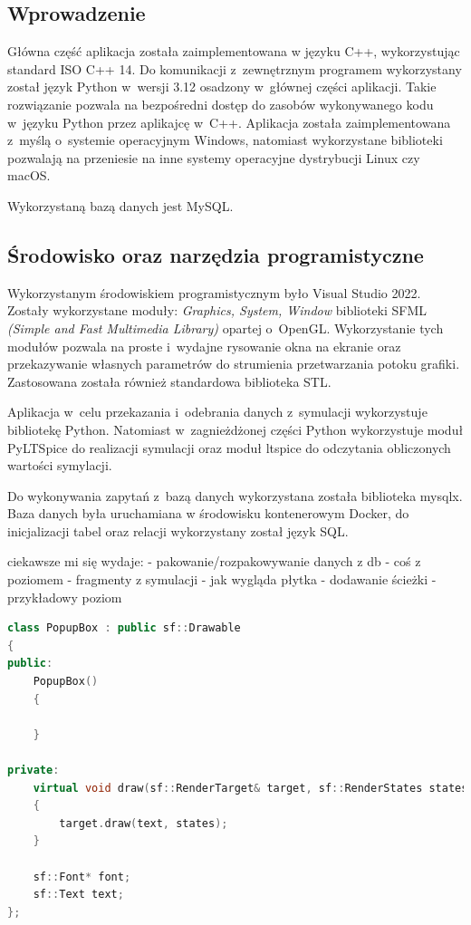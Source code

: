 \documentclass[12pt,a4paper]{article} %
\begin{document}
\subsection{Wprowadzenie} %
\aka Główna część aplikacja została zaimplementowana w języku C++, wykorzystując standard ISO C++ 14. 
Do komunikacji z~zewnętrznym programem wykorzystany został język Python w~wersji 3.12 osadzony w~głównej części aplikacji. Takie rozwiązanie pozwala na bezpośredni dostęp do zasobów wykonywanego kodu w~języku Python przez aplikajcę w~C++. 
Aplikacja została zaimplementowana z~myślą o~systemie operacyjnym Windows, natomiast wykorzystane biblioteki pozwalają na przeniesie na inne systemy operacyjne dystrybucji Linux czy macOS. %

Wykorzystaną bazą danych jest MySQL.


\subsection{Środowisko oraz narzędzia programistyczne}
\aka Wykorzystanym środowiskiem programistycznym było Visual Studio 2022. Zostały wykorzystane moduły: \textit{Graphics, System, Window} biblioteki SFML \textit{(Simple and Fast Multimedia Library)} opartej o~OpenGL. Wykorzystanie tych modułów pozwala na proste i~wydajne rysowanie okna na ekranie oraz przekazywanie własnych parametrów do strumienia przetwarzania potoku grafiki. Zastosowana została również standardowa biblioteka STL. 

\aka Aplikacja w~celu przekazania i~odebrania danych z~symulacji wykorzystuje bibliotekę Python. Natomiast w~zagnieżdżonej części Python wykorzystuje moduł PyLTSpice do realizacji symulacji oraz moduł ltspice do odczytania obliczonych wartości symylacji.

\aka Do wykonywania zapytań z~bazą danych wykorzystana została biblioteka mysqlx. Baza danych była uruchamiana w środowisku kontenerowym Docker, do inicjalizacji tabel oraz relacji wykorzystany został język SQL. 

ciekawsze mi się wydaje:
- pakowanie/rozpakowywanie danych z db
- coś z poziomem
- fragmenty z symulacji
- jak wygląda płytka
- dodawanie ścieżki
- przykładowy poziom

\begin{lstlisting}[language=C++, caption={awawd \\ Źródło: opracowanie własne}]
  class PopupBox : public sf::Drawable
{
public:
	PopupBox()
	{

	}

private:
	virtual void draw(sf::RenderTarget& target, sf::RenderStates states) const
	{
		target.draw(text, states);
	}

	sf::Font* font;
	sf::Text text;
};
\end{lstlisting}
\end{document}
